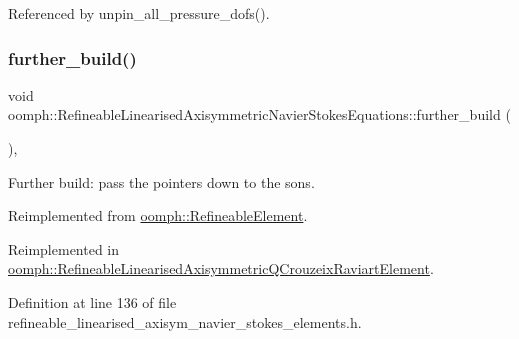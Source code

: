 Referenced by unpin\+\_\+all\+\_\+pressure\+\_\+dofs().

\mbox{\label{classoomph_1_1RefineableLinearisedAxisymmetricNavierStokesEquations_aed7750eee08d103a6872b4ef882c24cd}} 
\subsubsection{\texorpdfstring{further\+\_\+build()}{further\_build()}}
{\footnotesize\ttfamily void oomph\+::\+Refineable\+Linearised\+Axisymmetric\+Navier\+Stokes\+Equations\+::further\+\_\+build (\begin{DoxyParamCaption}{ }\end{DoxyParamCaption})\hspace{0.3cm}{\ttfamily [inline]}, {\ttfamily [virtual]}}



Further build\+: pass the pointers down to the sons. 



Reimplemented from \hyperlink{classoomph_1_1RefineableElement_a26628ce36dfad028686adeb4694a9ef3}{oomph\+::\+Refineable\+Element}.



Reimplemented in \hyperlink{classoomph_1_1RefineableLinearisedAxisymmetricQCrouzeixRaviartElement_a075e75e685c8d0cd2851b36f6bd865e0}{oomph\+::\+Refineable\+Linearised\+Axisymmetric\+Q\+Crouzeix\+Raviart\+Element}.



Definition at line 136 of file refineable\+\_\+linearised\+\_\+axisym\+\_\+navier\+\_\+stokes\+\_\+elements.\+h.



